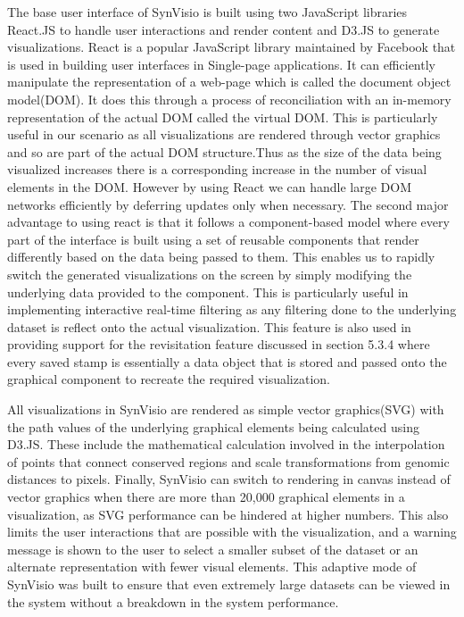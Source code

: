 The base user interface of SynVisio is built using two JavaScript libraries React.JS\cite{react} to handle user interactions and render content and D3.JS\cite{d3js} to generate visualizations.
React is a popular JavaScript library maintained by Facebook\cite{facebook} that is used in building user interfaces in Single-page applications. It can efficiently manipulate the representation of a web-page which is called the document object model(DOM). It does this through a process of reconciliation with an in-memory representation of the actual DOM called the virtual DOM. This is particularly useful in our scenario as all visualizations are rendered through vector graphics and so are part of the actual DOM structure.Thus as the size of the data being visualized increases there is a corresponding increase in the number of visual elements in the DOM. However by using React we can handle large DOM networks efficiently by deferring updates only when necessary. The second major advantage to using react is that it follows a component-based model where every part of the interface is built using a set of reusable components that render differently based on the data being passed to them. This enables us to rapidly switch the generated visualizations on the screen by simply modifying the underlying data provided to the component. This is particularly useful in implementing interactive real-time filtering as any filtering done to the underlying dataset is reflect onto the actual visualization. This feature is also used in providing support for the revisitation feature discussed in section 5.3.4 where every saved stamp is essentially a data object that is stored and passed onto the graphical component to recreate the required visualization.

All visualizations in SynVisio are rendered as simple vector graphics(SVG) with the path values of the underlying graphical elements being calculated using D3.JS. These include the mathematical calculation involved in the interpolation of points that connect conserved regions and scale transformations from genomic distances to pixels. Finally, SynVisio can switch to rendering in canvas instead of vector graphics when there are more than 20,000 graphical elements in a visualization, as SVG performance can be hindered at higher numbers. This also limits the user interactions that are possible with the visualization, and a warning message is shown to the user to select a smaller subset of the dataset or an alternate representation with fewer visual elements. This adaptive mode of SynVisio was built to ensure that even extremely large datasets can be viewed in the system without a breakdown in the system performance.
